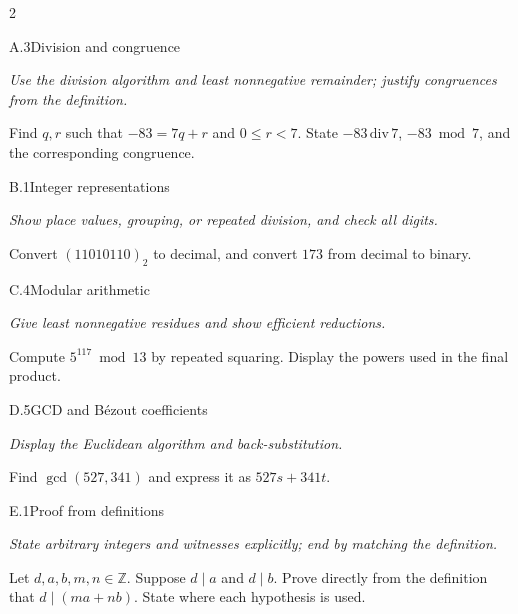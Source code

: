 \documentclass[9pt]{extarticle}
\begin{document}
\begin{multicols}{2}
\begin{CoreProblem}{A.3}{Division and congruence}
{\scriptsize\textit{Use the division algorithm and least nonnegative remainder; justify congruences from the definition.}\par}
Find $q,r$ such that $-83=7q+r$ and $0\le r<7$. State
$-83\,\mathrm{div}\,7$, $-83\bmod7$, and the corresponding congruence.
\end{CoreProblem}
\begin{CoreProblem}{B.1}{Integer representations}
{\scriptsize\textit{Show place values, grouping, or repeated division, and check all digits.}\par}
Convert $(11010110)_2$ to decimal, and convert $173$ from decimal to binary.
\end{CoreProblem}
\begin{CoreProblem}{C.4}{Modular arithmetic}
{\scriptsize\textit{Give least nonnegative residues and show efficient reductions.}\par}
Compute $5^{117}\bmod13$ by repeated squaring. Display the powers used in the
final product.
\end{CoreProblem}
\columnbreak
\begin{CoreProblem}{D.5}{GCD and B\'ezout coefficients}
{\scriptsize\textit{Display the Euclidean algorithm and back-substitution.}\par}
Find $\gcd(527,341)$ and express it as $527s+341t$.
\end{CoreProblem}
\begin{CoreProblem}{E.1}{Proof from definitions}
{\scriptsize\textit{State arbitrary integers and witnesses explicitly; end by matching the definition.}\par}
Let $d,a,b,m,n\in\mathbb Z$. Suppose $d\mid a$ and $d\mid b$. Prove directly
from the definition that $d\mid(ma+nb)$. State where each hypothesis is used.
\end{CoreProblem}
\end{multicols}
\CoreWorkArea
\FormBreak
{}
\end{document}
